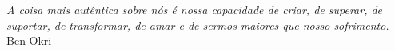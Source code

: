 
\chapter*{}
\vspace{15cm}
\begin{flushright}
	\textit
	{
		A coisa mais autêntica sobre nós é nossa capacidade de criar, de superar, de suportar, de transformar, de amar e de sermos maiores que nosso sofrimento.
	}\medskip\\ 
	Ben Okri
\end{flushright}